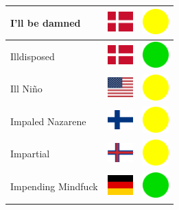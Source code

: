 \documentclass[12pt, a4paper, twoside]{report}
\begin{document}
\begin{center}
\begin{longtable}{|p{5cm}|p{2cm}|p{2cm}|}
I'll be damned & \includegraphics[width=1cm]{4x3/dk} & \includegraphics[width=1cm]{likes/m} \\ \hline
Illdisposed & \includegraphics[width=1cm]{4x3/dk} & \includegraphics[width=1cm]{likes/y} \\ \hline
Ill Niño & \includegraphics[width=1cm]{4x3/us} & \includegraphics[width=1cm]{likes/m} \\ \hline
Impaled Nazarene & \includegraphics[width=1cm]{4x3/fi} & \includegraphics[width=1cm]{likes/m} \\ \hline
Impartial & \includegraphics[width=1cm]{4x3/fo} & \includegraphics[width=1cm]{likes/m} \\ \hline
Impending Mindfuck & \includegraphics[width=1cm]{4x3/de} & \includegraphics[width=1cm]{likes/y} \\ \hline

\end{longtable}
\end{center}
\end{document}
